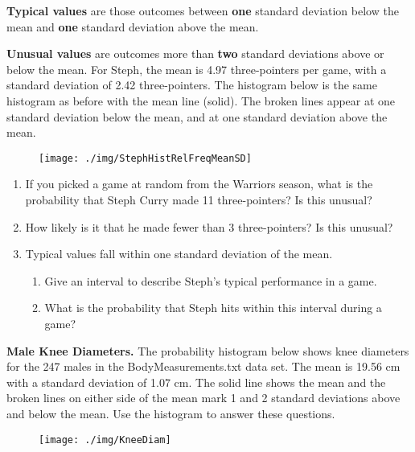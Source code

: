 \textbf{Typical values} are those outcomes between \textbf{one} standard deviation below the mean and \textbf{one} standard deviation above the mean.

\textbf{Unusual values} are outcomes more than \textbf{two} standard deviations above or below the mean.
\newpage
For Steph, the mean is 4.97 three-pointers per game, with a standard deviation of 2.42 three-pointers. The histogram below is the same histogram as before with the mean line (solid). The broken lines appear at one standard deviation below the mean, and at one standard deviation above the mean. 
\begin{figure}[h]
\centering{}\texttt{[image: ./img/StephHistRelFreqMeanSD]}
\end{figure}
\begin{enumerate}
\item If you picked a game at random from the Warriors season, what is the probability that Steph Curry made 11 three-pointers? Is this unusual?\\[.5cm]
\item How likely is it that he made fewer than 3 three-pointers? Is this unusual?\\[.5cm]
\item Typical values fall within one standard deviation of the mean.
\begin{enumerate}
\item Give an interval to describe Steph's typical performance in a game.\\[.5cm]
\item What is the probability that Steph hits within this interval during a game?
\end{enumerate}
\end{enumerate}
\newpage
\textbf{Male Knee Diameters.} The probability histogram below shows knee diameters for the 247 males in the BodyMeasurements.txt data set. The mean is 19.56 cm with a standard deviation of 1.07 cm. The solid line shows the mean and the broken lines on either side of the mean mark 1 and 2 standard deviations above and below the mean. Use the histogram to answer these questions. 
\begin{figure}[h]
\centering{}\texttt{[image: ./img/KneeDiam]}
\end{figure}

